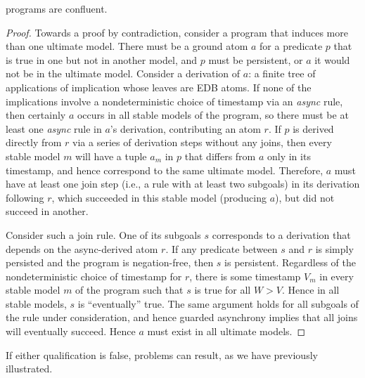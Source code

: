 \begin{theorem}
\label{thm:confluence}
\slang programs are confluent.
\end{theorem}
\begin{proof}

Towards a proof by contradiction, consider a \slang program that 
induces more than one ultimate model.  There must be a ground atom $a$ for a predicate $p$
that is true in one but
not in another model, and $p$ must be persistent, or $a$ it would not be
in the ultimate model.  Consider a derivation of $a$: a finite tree of applications of
implication whose leaves are EDB atoms.  If none of the implications involve a nondeterministic
choice of timestamp via an {\em async} rule, then certainly 
$a$ occurs in all stable models of the program,
so there must be at least one {\em async} rule in $a$'s derivation, contributing an atom
$r$.  
If $p$ is derived directly from 
$r$ via a series of derivation steps without any joins, then every stable
model $m$ will have a tuple $a_m$ in $p$ that differs from $a$ only in its timestamp, 
and hence correspond to the same ultimate model.
Therefore, $a$ must have at least one join step (i.e., a rule with at least two subgoals)
in its derivation following $r$,
which succeeded in this stable model (producing $a$), but did not succeed in another.  

Consider such  a join rule.  One of its subgoals $s$ corresponds to a derivation that depends
on the async-derived atom $r$.  If any predicate between $s$ and $r$ is simply persisted and 
the program is negation-free,
then $s$ is persistent.  Regardless of the nondeterministic choice of timestamp for $r$, there
is some timestamp $V_m$ in every stable model $m$ of the program such that $s$ is true
for all $W > V$.  Hence in all stable models, $s$ is ``eventually'' true.  The same argument holds
for all subgoals of the rule under consideration, and hence guarded asynchrony implies that
all joins will eventually succeed.
Hence $a$ must exist in all ultimate models.
\end{proof}


If either qualification is false, problems can result, as we have previously illustrated.

